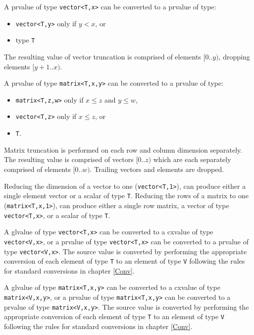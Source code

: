 \p A prvalue of type \texttt{vector<T,x>} can be converted to a prvalue of type:
\begin{itemize}
\item \texttt{vector<T,y>} only if \( y < x \), or
\item type \texttt{T}
\end{itemize}

\p The resulting value of vector truncation is comprised of elements \( [0..y)
\), dropping elements \( [y+1..x) \).

\p A prvalue of type \texttt{matrix<T,x,y>} can be converted to a prvalue of
type:
\begin{itemize}
  \item \texttt{matrix<T,z,w>} only if \( x \leq z \) and \(y \leq w \),
  \item \texttt{vector<T,z>} only if \( x \leq z \), or
  \item \texttt{T}.
\end{itemize}

\p Matrix truncation is performed on each row and column dimension separately.
The resulting value is comprised of vectors \( [0..z) \) which are each
separately comprised of elements \( [0..w) \). Trailing vectors and elements are
dropped.

\p Reducing the dimension of a vector to one (\texttt{vector<T,1>}), can produce
either a single element vector or a scalar of type \texttt{T}. Reducing the
rows of a matrix to one (\texttt{matrix<T,x,1>}), can produce either a single
row matrix, a vector of type \texttt{vector<T,x>}, or a scalar of type
\texttt{T}.


\p A glvalue of type \texttt{vector<T,x>} can be converted to a cxvalue of type
\texttt{vector<V,x>}, or a prvalue of type \texttt{vector<T,x>} can be converted
to a prvalue of type \texttt{vector<V,x>}. The source value is converted by
performing the appropriate conversion of each element of type \texttt{T} to an
element of type \texttt{V} following the rules for standard conversions
in chapter \ref{Conv}.

\p A glvalue of type \texttt{matrix<T,x,y>} can be converted to a cxvalue of
type \texttt{matrix<V,x,y>}, or a prvalue of type \texttt{matrix<T,x,y>} can be
converted to a prvalue of type \texttt{matrix<V,x,y>}. The source value is
converted by performing the appropriate conversion of each element of type
\texttt{T} to an element of type \texttt{V} following the rules for standard
conversions in chapter \ref{Conv}.


